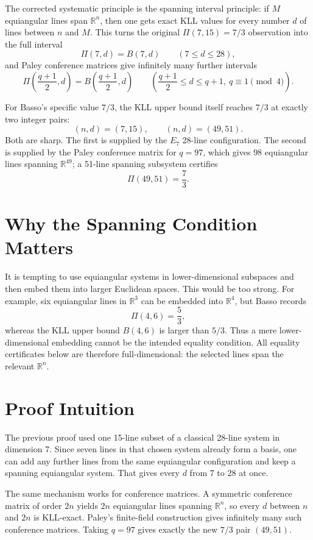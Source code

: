 \documentclass[11pt]{article}
\newcommand{\R}{\mathbb{R}}
\newcommand{\PiRel}{\Pi}
\newcommand{\Bnd}{B}
\begin{document}
The corrected systematic principle is the spanning interval principle:
if \(M\) equiangular lines span \(\R^n\), then one gets exact KLL values for
every number \(d\) of lines between \(n\) and \(M\).  This turns the original
\(\PiRel(7,15)=7/3\) observation into the full interval
\[
  \PiRel(7,d)=\Bnd(7,d)\qquad(7\le d\le28),
\]
and Paley conference matrices give infinitely many further intervals
\[
  \PiRel\left(\frac{q+1}{2},d\right)
  =
  \Bnd\left(\frac{q+1}{2},d\right)
  \qquad
  \left(\frac{q+1}{2}\le d\le q+1,\ q\equiv1\pmod4\right).
\]

For Basso's specific value \(7/3\), the KLL upper bound itself reaches
\(7/3\) at exactly two integer pairs:
\[
  (n,d)=(7,15),\qquad (n,d)=(49,51).
\]
Both are sharp.  The first is supplied by the \(E_7\) 28-line configuration.
The second is supplied by the Paley conference matrix for \(q=97\), which
gives \(98\) equiangular lines spanning \(\R^{49}\); a 51-line spanning
subsystem certifies
\[
  \PiRel(49,51)=\frac73.
\]

\section*{Why the Spanning Condition Matters}

It is tempting to use equiangular systems in lower-dimensional subspaces and
then embed them into larger Euclidean spaces.  This would be too strong.  For
example, six equiangular lines in \(\R^3\) can be embedded into \(\R^4\), but
Basso records
\[
  \PiRel(4,6)=\frac53,
\]
whereas the KLL upper bound \(\Bnd(4,6)\) is larger than \(5/3\).  Thus a
mere lower-dimensional embedding cannot be the intended equality condition.
All equality certificates below are therefore full-dimensional: the selected
lines span the relevant \(\R^n\).

\section*{Proof Intuition}

The previous proof used one 15-line subset of a classical 28-line system in
dimension 7.  Since seven lines in that chosen system already form a basis,
one can add any further lines from the same equiangular configuration and keep
a spanning equiangular system.  That gives every \(d\) from 7 to 28 at once.

The same mechanism works for conference matrices.  A symmetric conference
matrix of order \(2n\) yields \(2n\) equiangular lines spanning \(\R^n\), so
every \(d\) between \(n\) and \(2n\) is KLL-exact.  Paley's finite-field
construction gives infinitely many such conference matrices.  Taking
\(q=97\) gives exactly the new \(7/3\) pair \((49,51)\).
\end{document}
